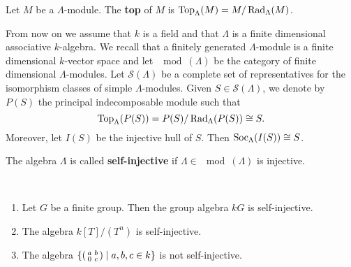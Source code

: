%




\begin{definition}
Let $M$ be a $\Lambda$-module. The \textbf{top} of $M$ is $\operatorname{Top}_\Lambda(M)=M/\operatorname{Rad}_\Lambda(M)$.
\end{definition}


From now on we assume that $k$ is a field and that $\Lambda$ is a finite dimensional associative $k$-algebra. We recall that a finitely generated $\Lambda$-module is a finite dimensional $k$-vector space and let $\mod(\Lambda)$ be the category of finite dimensional $\Lambda$-modules.
Let $\mathcal S(\Lambda)$ be a complete set of representatives for the isomorphism classes of simple $\Lambda$-modules. Given $S\in\mathcal S(\Lambda)$, we denote by $P(S)$ the principal indecomposable module such that
\[
\operatorname{Top}_\Lambda(P(S)) = P(S)/\operatorname{Rad}_\Lambda(P(S))\cong S.
\]
Moreover, let $I(S)$ be the injective hull of $S$. Then $\operatorname{Soc}_\Lambda(I(S))\cong S$.


\begin{definition}
The algebra $\Lambda$ is called \textbf{self-injective} if $\Lambda\in\mod(\Lambda)$ is injective.
\end{definition}


\begin{example}\
\begin{enumerate}
\item Let $G$ be a finite group. Then the group algebra $kG$ is self-injective.
\item The algebra $k[T]/(T^n)$ is self-injective.
\item The algebra $\{\begin{psmallmatrix} a & b \\ 0 & c \end{psmallmatrix} \mid a,b,c\in k\}$ is not self-injective.
\end{enumerate}
\end{example}

